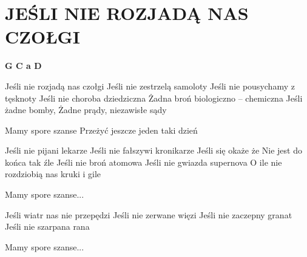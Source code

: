 \documentclass[../../../songbook.tex]{subfiles}
\begin{document}
\TabPositions{8cm} %
\section*{JEŚLI NIE ROZJADĄ NAS CZOŁGI}
{}
\vspace{0.5cm}

{\color{red}\textbf{G C a D} } \newline

Jeśli nie rozjadą nas czołgi			 \newline
Jeśli nie zestrzelą samoloty			 \newline
Jeśli nie pousychamy z tęsknoty 		 \newline
Jeśli nie choroba dziedziczna 			 \newline
Żadna broń biologiczno – chemiczna 		 \newline
Jeśli żadne bomby, 						 \newline
Żadne prądy, niezawisłe sądy			 \newline

\-\hspace{1cm} Mamy spore szanse 			 \newline
\-\hspace{1cm} Przeżyć jeszcze jeden taki dzień 	 \newline

Jeśli nie pijani lekarze		\newline
Jeśli nie fałszywi kronikarze	\newline
Jeśli się okaże że				\newline
Nie jest do końca tak źle		\newline
Jeśli nie broń atomowa			\newline
Jeśli nie gwiazda supernova		\newline
O ile nie rozdziobią nas kruki i gile 	\newline

\-\hspace{1cm} Mamy spore szanse...	\newline

Jeśli wiatr nas nie przepędzi	\newline
Jeśli nie zerwane więzi			\newline
Jeśli nie zaczepny granat		\newline
Jeśli nie szarpana rana			\newline

\-\hspace{1cm} Mamy spore szanse...	
\end{document}
